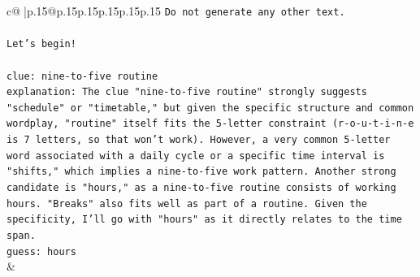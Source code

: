 \documentclass{article}
\begin{document}
{\begin{supertabular}{c@{$\;$}|p{.15\linewidth}@{}p{.15\linewidth}p{.15\linewidth}p{.15\linewidth}p{.15\linewidth}p{.15\linewidth}}
{{{\texttt{Do not generate any other text.} \\
\\ 
\texttt{Let's begin!} \\
\\ 
\texttt{clue: nine{-}to{-}five routine} \\
\texttt{explanation: The clue "nine{-}to{-}five routine" strongly suggests "schedule" or "timetable," but given the specific structure and common wordplay, "routine" itself fits the 5{-}letter constraint (r{-}o{-}u{-}t{-}i{-}n{-}e is 7 letters, so that won't work). However, a very common 5{-}letter word associated with a daily cycle or a specific time interval is "shifts," which implies a nine{-}to{-}five work pattern. Another strong candidate is "hours," as a nine{-}to{-}five routine consists of working hours. "Breaks" also fits well as part of a routine. Given the specificity, I'll go with "hours" as it directly relates to the time span.} \\
\texttt{guess: hours} \\
            }
        }
    }
    & \\ \\


\end{supertabular}}
\end{document}
